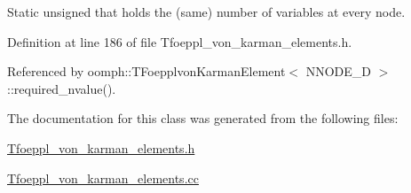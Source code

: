 Static unsigned that holds the (same) number of variables at every node. 



Definition at line 186 of file Tfoeppl\+\_\+von\+\_\+karman\+\_\+elements.\+h.



Referenced by oomph\+::\+T\+Foepplvon\+Karman\+Element$<$ N\+N\+O\+D\+E\+\_\+D $>$\+::required\+\_\+nvalue().



The documentation for this class was generated from the following files\+:\begin{DoxyCompactItemize}
\item 
\hyperlink{Tfoeppl__von__karman__elements_8h}{Tfoeppl\+\_\+von\+\_\+karman\+\_\+elements.\+h}\item 
\hyperlink{Tfoeppl__von__karman__elements_8cc}{Tfoeppl\+\_\+von\+\_\+karman\+\_\+elements.\+cc}\end{DoxyCompactItemize}
